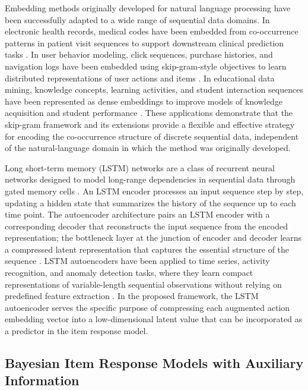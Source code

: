 \documentclass[A4paper,11pt]{article}
\begin{document}
Embedding methods originally developed for natural language processing have been successfully adapted to a wide range of sequential data domains. In electronic health records, medical codes have been embedded from co-occurrence patterns in patient visit sequences to support downstream clinical prediction tasks \citep{choi2016multi}. In user behavior modeling, click sequences, purchase histories, and navigation logs have been embedded using skip-gram-style objectives to learn distributed representations of user actions and items \citep{grbovic2015commerce, barkan2016item2vec}. In educational data mining, knowledge concepts, learning activities, and student interaction sequences have been represented as dense embeddings to improve models of knowledge acquisition and student performance \citep{pardos2020university}. These applications demonstrate that the skip-gram framework and its extensions provide a flexible and effective strategy for encoding the co-occurrence structure of discrete sequential data, independent of the natural-language domain in which the method was originally developed.

Long short-term memory (LSTM) networks are a class of recurrent neural networks designed to model long-range dependencies in sequential data through gated memory cells \citep{hochreiter1997long}. An LSTM encoder processes an input sequence step by step, updating a hidden state that summarizes the history of the sequence up to each time point. The autoencoder architecture pairs an LSTM encoder with a corresponding decoder that reconstructs the input sequence from the encoded representation; the bottleneck layer at the junction of encoder and decoder learns a compressed latent representation that captures the essential structure of the sequence \citep{srivastava2015unsupervised}. LSTM autoencoders have been applied to time series, activity recognition, and anomaly detection tasks, where they learn compact representations of variable-length sequential observations without relying on predefined feature extraction \citep{malhotra2016lstm}. In the proposed framework, the LSTM autoencoder serves the specific purpose of compressing each augmented action embedding vector into a low-dimensional latent value that can be incorporated as a predictor in the item response model.

\subsection{Bayesian Item Response Models with Auxiliary Information}
\end{document}
